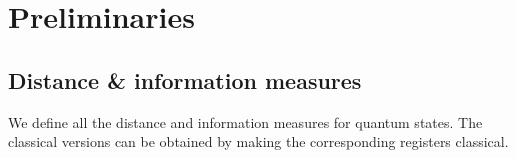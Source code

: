 














































































































\setcounter{section}{1}\setcounter{theorem}{8}\section{Preliminaries}
\subsection{Distance \& information measures}
We define all the distance and information measures for quantum states. The classical versions can be obtained by making the corresponding registers classical.

